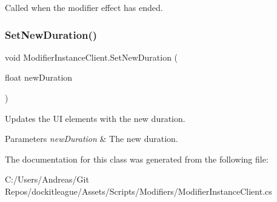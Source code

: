 Called when the modifier effect has ended. 

\hypertarget{class_modifier_instance_client_a1dc19ff93cf2053c841588a689a081dc}{}\label{class_modifier_instance_client_a1dc19ff93cf2053c841588a689a081dc} 
\subsubsection{\texorpdfstring{Set\+New\+Duration()}{SetNewDuration()}}
{\footnotesize\ttfamily void Modifier\+Instance\+Client.\+Set\+New\+Duration (\begin{DoxyParamCaption}\item[{float}]{new\+Duration }\end{DoxyParamCaption})}



Updates the UI elements with the new duration. 


\begin{DoxyParams}{Parameters}
{\em new\+Duration} & The new duration.\\
\hline
\end{DoxyParams}


The documentation for this class was generated from the following file\+:\begin{DoxyCompactItemize}
\item 
C\+:/\+Users/\+Andreas/\+Git Repos/dockitleague/\+Assets/\+Scripts/\+Modifiers/Modifier\+Instance\+Client.\+cs\end{DoxyCompactItemize}
